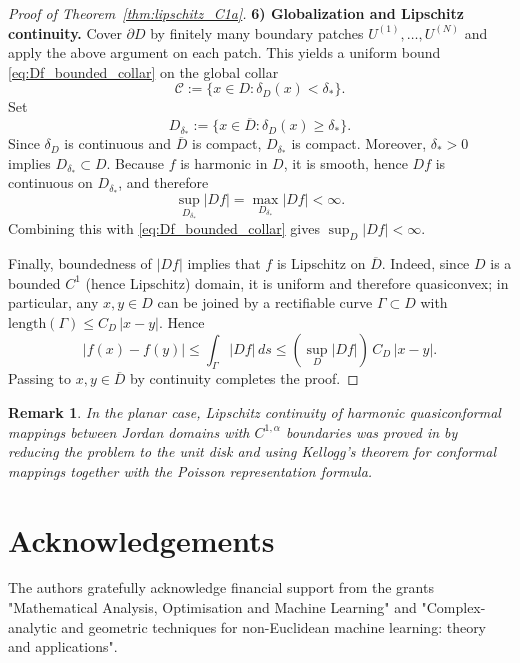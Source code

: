 \documentclass{amsart}
\newtheorem{remark}[theorem]{Remark}
\begin{document}
\begin{proof}[Proof of Theorem~\ref{thm:lipschitz_C1a}]
\medskip
\noindent\textbf{6) Globalization and Lipschitz continuity.}
Cover $\partial D$ by finitely many boundary patches $U^{(1)},\dots,U^{(N)}$ and apply the above
argument on each patch. This yields a uniform bound \eqref{eq:Df_bounded_collar} on the global collar
\[
\mathcal C:=\{x\in D:\delta_D(x)<\delta_*\}.
\]
Set
\[
D_{\delta_*}:=\{x\in \overline D:\delta_D(x)\ge \delta_*\}.
\]
Since $\delta_D$ is continuous and $\overline D$ is compact, $D_{\delta_*}$ is compact. Moreover,
$\delta_*>0$ implies $D_{\delta_*}\subset D$. Because $f$ is harmonic in $D$, it is smooth, hence $Df$ is
continuous on $D_{\delta_*}$, and therefore
\[
\sup_{D_{\delta_*}}|Df|=\max_{D_{\delta_*}}|Df|<\infty.
\]
Combining this with \eqref{eq:Df_bounded_collar} gives $\sup_D|Df|<\infty$.

Finally, boundedness of $|Df|$ implies that $f$ is Lipschitz on $\overline D$. Indeed, since $D$ is a bounded $C^{1}$ (hence Lipschitz) domain, it is uniform and therefore quasiconvex; in particular,
any $x,y\in D$ can be joined by a rectifiable curve $\Gamma\subset D$ with $\mathrm{length}(\Gamma)\le C_D\,|x-y|$. Hence
\[
|f(x)-f(y)|\le \int_\Gamma |Df|\,ds \le (\sup_D|Df|)\,C_D\,|x-y|.
\]
Passing to $x,y\in\overline D$ by continuity completes the proof.
\end{proof}


\begin{remark}
In the planar case, Lipschitz continuity of harmonic quasiconformal mappings
between Jordan domains with $C^{1,\alpha}$ boundaries was proved in \cite{Kalaj2008MZ}
by reducing the problem to the unit disk and using Kellogg's theorem for conformal mappings
together with the Poisson representation formula.
\end{remark}
\section*{Acknowledgements}
The authors gratefully acknowledge financial support from the grants "Mathematical Analysis, Optimisation and Machine Learning" and "Complex-analytic and geometric techniques for non-Euclidean machine learning: theory and applications".
\end{document}
